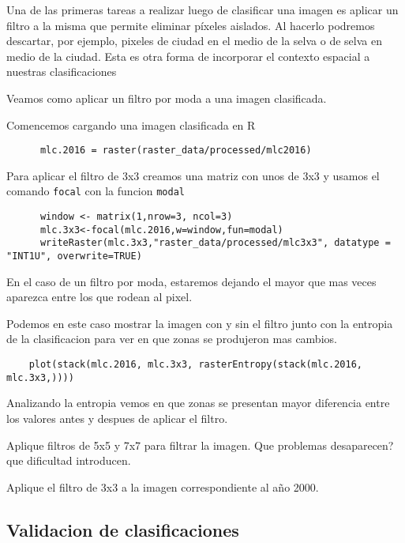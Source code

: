 Una de las primeras tareas a realizar luego de clasificar una imagen es
aplicar un filtro a la misma que permite eliminar p\'ixeles aislados. Al
hacerlo podremos descartar, por ejemplo, pixeles de ciudad en el medio de la selva
o de selva en medio de la ciudad. Esta es otra forma de incorporar el contexto
espacial a nuestras clasificaciones
\begin{exa}
  Veamos como aplicar un filtro por moda a una imagen clasificada.

  Comencemos cargando una imagen clasificada en R
  \begin{lstlisting}
      mlc.2016 = raster(raster_data/processed/mlc2016)
  \end{lstlisting}

  Para aplicar el filtro de 3x3 creamos una matriz con unos de 3x3 y usamos
  el comando \texttt{focal} con la funcion \texttt{modal}

  \begin{lstlisting}
      window <- matrix(1,nrow=3, ncol=3)
      mlc.3x3<-focal(mlc.2016,w=window,fun=modal)
      writeRaster(mlc.3x3,"raster_data/processed/mlc3x3", datatype = "INT1U", overwrite=TRUE)
  \end{lstlisting}
  En el caso de un filtro por moda, estaremos dejando el mayor que mas veces
  aparezca entre los que rodean al pixel.

  Podemos en este caso mostrar la imagen con y sin el filtro junto con la entropia
  de la clasificacion para ver en que zonas se produjeron mas cambios.

  \begin{lstlisting}
    plot(stack(mlc.2016, mlc.3x3, rasterEntropy(stack(mlc.2016, mlc.3x3,))))
  \end{lstlisting}

  Analizando la entropia vemos en que zonas se presentan mayor diferencia entre
  los valores antes y despues de aplicar el filtro.

\end{exa}
\begin{act}
    Aplique filtros de 5x5 y 7x7 para filtrar la imagen. Que problemas
    desaparecen? que dificultad introducen.
\end{act}

\begin{act}
    Aplique el filtro de 3x3 a la imagen correspondiente al año 2000.
\end{act}

\subsection{Validacion de clasificaciones}


